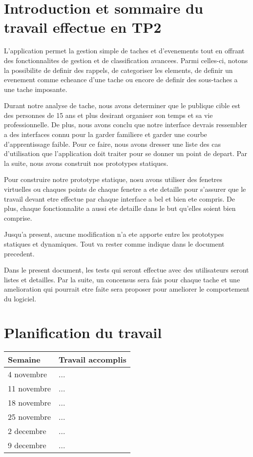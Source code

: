 \documentclass[letterpaper, oneside, 12pt, these, creativecommons]{thETS}
\begin{document}
\tableofcontents
\listoftables
\listoffigures

\chapter{Introduction et sommaire du travail effectue en TP2}

L'application permet la gestion simple de taches et d'evenements tout en offrant des fonctionnalites de gestion et de classification avancees. Parmi celles-ci, notons la possibilite de definir des rappels, de categoriser les elements, de definir un evenement comme echeance d'une tache ou encore de definir des sous-taches a une tache imposante.

Durant notre analyse de tache, nous avons determiner que le publique cible est des personnes de 15 ans et plus desirant organiser son temps et sa vie professionnelle. De plus, nous avons conclu que notre interface devrais ressembler a des interfaces connu pour la garder familiere et garder une courbe d'apprentissage faible. Pour ce faire, nous avons dresser une liste des cas d'utilisation que l'application doit traiter pour se donner un point de depart. Par la suite, nous avons construit nos prototypes statiques.

Pour construire notre prototype statique, nosu avons utiliser des fenetres virtuelles ou chaques points de chaque fenetre a ete detaille pour s'assurer que le travail devant etre effectue par chaque interface a bel et bien ete compris. De plus, chaque fonctionnalite a aussi ete detaille dans le but qu'elles soient bien comprise.

Jusqu'a present, aucune modification n'a ete apporte entre les prototypes statiques et dynamiques. Tout va rester comme indique dans le document precedent.

Dans le present document, les tests qui seront effectue avec des utilisateurs seront listes et detailles. Par la suite, un concensus sera fais pour chaque tache et une amelioration qui pourrait etre faite sera proposer pour ameliorer le comportement du logiciel.

\chapter{Planification du travail}

\begin{table}
	\centering
	\begin{tabular}{|l|l|}
		\hline
		Semaine	& Travail accomplis 	\\ \hline
		4 novembre	& ... 			\\ \hline
		11 novembre	& ... 			\\ \hline
		18 novembre	& ... 			\\ \hline
		25 novembre	& ... 			\\ \hline
		2 decembre	& ... 			\\ \hline
		9 decembre	& ... 			\\ \hline
	\end{tabular}
\end{table}
\end{document}
